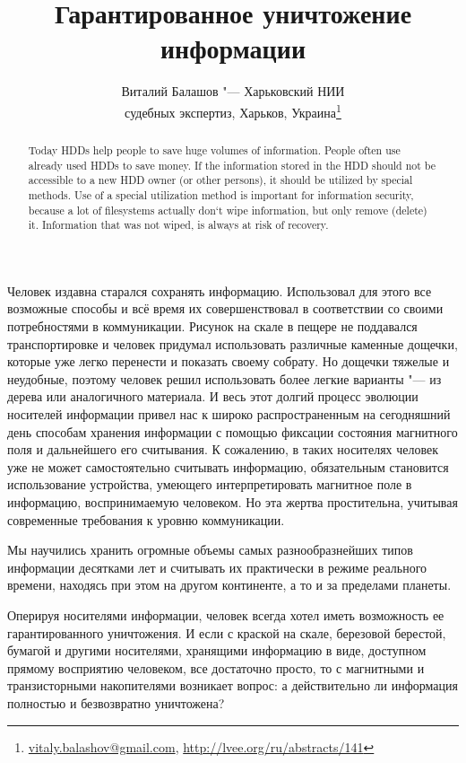 \documentclass[10pt, a5paper]{article}
\begin{document}
\title{Гарантированное уничтожение информации}
\author{Виталий Балашов "--- Харьковский НИИ \\ судебных экспертиз, Харьков, Украина\footnote{\url{vitaly.balashov@gmail.com}, \url{http://lvee.org/ru/abstracts/141}}}
\maketitle
\begin{abstract}
Today HDDs help people to save huge volumes of information.  People often use already used HDDs to save money. If the infor\-mation stored in the HDD should not be accessible to a new HDD owner (or other persons), it should be utilized by special methods. Use of a special utilization method is important for information security, because a lot of filesystems actually don`t wipe information, but only remove (delete) it. Information that was not wiped, is always at risk of recovery.  
\end{abstract}
Человек издавна старался сохранять информацию. Использовал для этого все возможные способы и всё время их совершенствовал в соответствии со своими потребностями в коммуникации. Рисунок на скале в пещере не поддавался транспортировке и человек придумал использовать различные каменные дощечки, которые уже легко перенести и показать своему собрату. Но дощечки тяжелые и неудобные, поэтому человек решил использовать более легкие варианты "--- из дерева или аналогичного материала.  И весь этот долгий процесс эволюции носителей информации привел нас к широко распространенным на сегодняшний день способам хранения информации с помощью фиксации состояния магнитного поля  и дальнейшего его считывания.  К сожалению, в таких носителях человек уже не может самостоятельно считывать информацию, обязательным становится использование устройства, умеющего интерпретировать магнитное поле в информацию, воспринимаемую человеком. Но эта жертва простительна, учитывая современные требования к уровню коммуникации.

Мы научились хранить огромные объемы самых разнообразнейших типов информации десятками лет и считывать их практически в режиме реального времени, находясь при этом на другом континенте, а то и за пределами планеты.

Оперируя носителями информации, человек всегда хотел иметь возможность ее гарантированного уничтожения. И если с краской на скале, березовой берестой, бумагой и другими носителями, хранящими информацию в виде, доступном прямому восприятию человеком, все достаточно просто, то с магнитными и транзисторными накопителями возникает вопрос: а действительно ли информация полностью и безвозвратно уничтожена?
\end{document}
